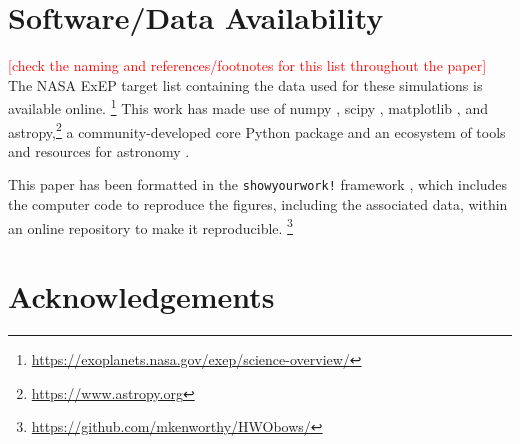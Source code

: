 \documentclass[usenatbib]{mnras}
\newcommand{\todo}[1]{\textcolor{red}{[#1]}}
\newcommand{\IWA}{\ensuremath{\mathrm{IWA}}\xspace}
\newcommand{\HWO}{HabWorlds\xspace}
\begin{document}
%
%
%

\section*{Software/Data Availability}

\todo{check the naming and references/footnotes for this list throughout the paper}
The NASA ExEP target list containing the data used for these simulations is  available online.%
\footnote{\url{https://exoplanets.nasa.gov/exep/science-overview/}}
This work has made use of \textsf{numpy}
 \citep{NumPy2020}, \textsf{scipy} \citep{scipy_2020}, \textsf{matplotlib} \citep{matplotlib2007}, and \textsf{astropy},\footnote{\url{https://www.astropy.org}} a community-developed core Python package and an ecosystem of tools and resources for astronomy \citep{astropy:2013, astropy:2018, astropy:2022}.

This paper has been formatted in the \texttt{showyourwork!} framework \citep{Luger2021}, which includes the computer code to reproduce the figures, including the associated data, within an online repository to make it reproducible.%
\footnote{\url{https://github.com/mkenworthy/HWObows/}}





\section*{Acknowledgements}
\end{document}
